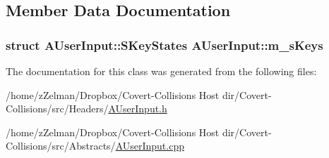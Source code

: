 \subsection{Member Data Documentation}
\hypertarget{classAUserInput_a55b881326b920413bbcdf6e02c4fb021}{
\subsubsection[{m\-\_\-s\-Keys}]{\setlength{\rightskip}{0pt plus 5cm}struct {\bf A\-User\-Input\-::\-S\-Key\-States}  A\-User\-Input\-::m\-\_\-s\-Keys\hspace{0.3cm}{\ttfamily [protected]}}}\label{classAUserInput_a55b881326b920413bbcdf6e02c4fb021}


The documentation for this class was generated from the following files\-:\begin{DoxyCompactItemize}
\item 
/home/z\-Zelman/\-Dropbox/\-Covert-\/\-Collisions Host dir/\-Covert-\/\-Collisions/src/\-Headers/\hyperlink{AUserInput_8h}{A\-User\-Input.\-h}\item 
/home/z\-Zelman/\-Dropbox/\-Covert-\/\-Collisions Host dir/\-Covert-\/\-Collisions/src/\-Abstracts/\hyperlink{AUserInput_8cpp}{A\-User\-Input.\-cpp}\end{DoxyCompactItemize}
